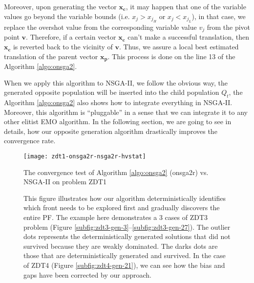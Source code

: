 \documentclass[journal]{IEEEtran}
\let\MYoriglatexcaption\caption
\renewcommand{\caption}[2][\relax]{\MYoriglatexcaption[#2]{#2}}
\begin{document}
Moreover, upon generating the vector \(\mathbf{x_c}\), it may happen that one of the variable values go beyond the variable bounds (i.e. \(x_j > x_{j_H}\) or \(x_j < x_{j_L}\)), in that case, we replace the overshot value from the corresponding variable value \(v_j\) from the pivot point \(\mathbf{v}\). Therefore, if a certain vector \(\mathbf{x_c}\) can't make a successful translation, then \(\mathbf{x_c}\) is reverted back to the vicinity of \(\mathbf{v}\). Thus, we assure a local best estimated translation of the parent vector \(\mathbf{x_p}\). This process is done on the line 13 of the Algorithm \ref{algo:onsga2}.

When we apply this algorithm to NSGA-II, we follow the obvious way, the generated opposite population will be inserted into the child population \(Q_t\), the Algorithm \ref{algo:onsga2} also shows how to integrate everything in NSGA-II. Moreover, this algorithm is ``pluggable'' in a sense that we can integrate it to any other elitist EMO algorithm. In the following section, we are going to see in details, how our opposite generation algorithm drastically improves the convergence rate.

\begin{figure}[tp!]
	\centering
	\texttt{[image: zdt1-onsga2r-nsga2r-hvstat]}
	\caption{The convergence test of Algorithm \ref{algo:onsga2} (onsga2r) vs. NSGA-II on problem ZDT1}
	\label{plot:zdt1-onsga2r}
\end{figure}
%
%
\begin{figure*}[tp!]
	\centering
	\hfill
		\caption{This figure illustrates how our algorithm deterministically identifies which front needs to be explored first and gradually discovers the entire PF. The example here demonstrates a 3 cases of ZDT3 problem (Figure \ref{subfig:zdt3-gen-3}--\ref{subfig:zdt3-gen-27}). The outlier dots represents the deterministically generated solutions that did not survived because they are weakly dominated. The darks dots are those that are deterministically generated and survived. In the case of ZDT4 (Figure \ref{subfig:zdt4-gen-21}), we can see how the bias and gaps have been corrected by our approach.}
	\label{fig:zdt3-gap}
\end{figure*}
%
\end{document}
